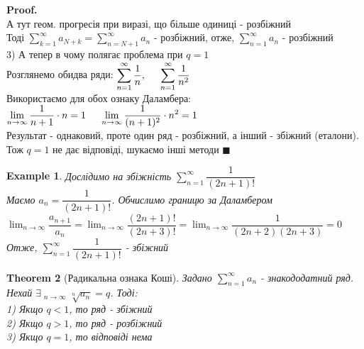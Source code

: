 \documentclass[a4paper, 14pt]{extarticle}
\DeclareMathOperator*\uplim{\overline{lim}}
\def\huge{\displaystyle}
\def\bigline{\vspace{5mm}\\}
\theoremstyle{theoremdd}
\newtheorem{theorem}{Theorem}[subsection]
\theoremstyle{theoremdd}
\theoremstyle{theoremdd}
\theoremstyle{theoremdd}
\newtheorem{example}[theorem]{Example}
\theoremstyle{theoremdd}
\theoremstyle{theoremdd}
\theoremstyle{theoremdd}
\theoremstyle{theoremdd}
\newenvironment{pf}{\vspace*{-3mm} \textbf{Proof. \\}}{$\blacksquare$}
\begin{document}
\begin{pf}
А тут геом. прогресія при виразі, що більше одиниці - розбіжний\\
Тоді $\huge \sum_{k=1}^{\infty} a_{N+k} = \sum_{n = N+1}^{\infty} a_{n}$ - розбіжний, отже, $\huge \sum_{n = 1}^{\infty} a_n$ - розбіжний
\bigline
3) А тепер в чому полягає проблема при $q = 1$\\
Розглянемо обидва ряди: $\huge \sum_{n=1}^\infty \dfrac{1}{n}, \hspace{0.5cm} \sum_{n=1}^\infty \dfrac{1}{n^2}$\\
Використаємо для обох ознаку Даламбера:\\
$\huge \lim_{n \to \infty} \dfrac{1}{n+1} \cdot n = 1 \hspace{0.5cm} \lim_{n \to \infty} \dfrac{1}{(n+1)^2} \cdot n^2 = 1$\\
Результат - однаковий, проте один ряд - розбіжний, а інший - збіжний (еталони).
Тож $q = 1$ не дає відповіді, шукаємо інші методи
\end{pf}

\begin{example}
Дослідимо на збіжність $\huge\sum_{n=1}^\infty \dfrac{1}{(2n+1)!}$\\
Маємо $a_n = \dfrac{1}{(2n+1)!}$. Обчислимо границю за Даламбером\\
$\huge \lim_{n \to \infty} \dfrac{a_{n+1}}{a_n} = \lim_{n \to \infty} \dfrac{(2n+1)!}{(2n+3)!} = \lim_{n \to \infty} \dfrac{1}{(2n+2)(2n+3)} = 0$\\
Отже, $\huge\sum_{n=1}^\infty \dfrac{1}{(2n+1)!}$ - збіжний
\end{example}

\begin{theorem}[Радикальна ознака Коші]
Задано $\huge \sum_{n=1}^{\infty} a_n$ - знакододатний ряд. Нехай $\exists \huge \uplim_{n \to \infty} \sqrt[n]{a_n} = q$. Тоді:\\
1) Якщо $q<1$, то ряд - збіжний\\
2) Якщо $q>1$, то ряд - розбіжний\\
3) Якщо $q=1$, то відповіді нема
\end{theorem}
\end{document}
